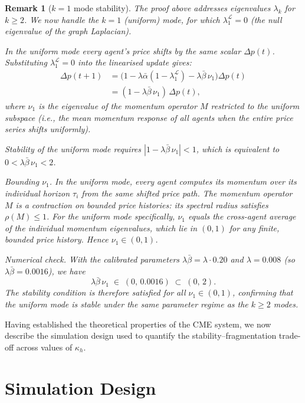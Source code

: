 \documentclass[10pt,twocolumn]{article}
\newtheorem{remark}{Remark}
\begin{document}
\begin{remark}[$k=1$ mode stability]
The proof above addresses eigenvalues $\lambda_k$ for $k \geq 2$.
We now handle the $k=1$ (uniform) mode, for which
$\lambda_1^{\mathcal{L}} = 0$ (the null eigenvalue of the graph Laplacian).

In the uniform mode every agent's price shifts by the same scalar
$\Delta p(t)$.  Substituting $\lambda_1^{\mathcal{L}} = 0$ into the
linearised update gives:
\begin{align*}
  \Delta p(t+1)
    &= \bigl(1 - \lambda\bar{\alpha}(1 - \lambda_1^{\mathcal{L}})
           - \lambda\bar{\beta}\,\nu_1\bigr)\Delta p(t) \\
    &= (1 - \lambda\bar{\beta}\,\nu_1)\,\Delta p(t),
\end{align*}
where $\nu_1$ is the eigenvalue of the momentum operator $M$ restricted
to the uniform subspace (i.e., the mean momentum response of all agents
when the entire price series shifts uniformly).

Stability of the uniform mode requires $|1 - \lambda\bar{\beta}\,\nu_1| < 1$,
which is equivalent to $0 < \lambda\bar{\beta}\,\nu_1 < 2$.

\textit{Bounding $\nu_1$.}
In the uniform mode, every agent computes its momentum over its individual
horizon $\tau_i$ from the same shifted price path.
The momentum operator $M$ is a contraction on bounded price histories:
its spectral radius satisfies $\rho(M) \leq 1$.
For the uniform mode specifically, $\nu_1$ equals the cross-agent average
of the individual momentum eigenvalues, which lie in $(0,1)$ for any
finite, bounded price history.  Hence $\nu_1 \in (0,1)$.

\textit{Numerical check.}
With the calibrated parameters $\lambda\bar{\beta} = \lambda \cdot 0.20$
and $\lambda = 0.008$ (so $\lambda\bar{\beta} = 0.0016$), we have
\[
  \lambda\bar{\beta}\,\nu_1 \;\in\; (0,\,0.0016) \;\subset\; (0,\,2).
\]
The stability condition is therefore satisfied for all $\nu_1 \in (0,1)$,
confirming that the uniform mode is stable under the same parameter regime
as the $k \geq 2$ modes.
\end{remark}

Having established the theoretical properties of the CME system, we now
describe the simulation design used to quantify the stability--fragmentation
trade-off across values of $\kappa_h$.

\section{Simulation Design}
\label{sec:sim}
\end{document}
